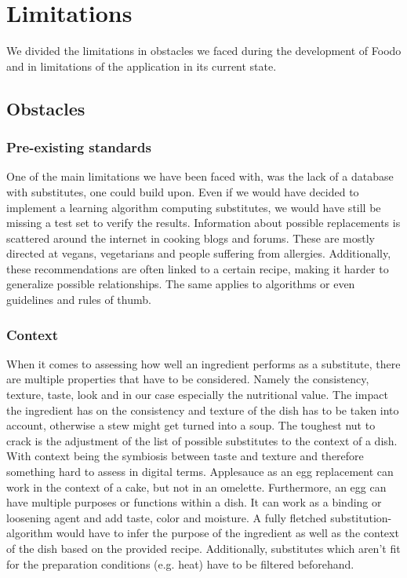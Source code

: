 \chapter{Limitations}

We divided the limitations in obstacles we faced during the development of Foodo and in limitations of the application in its current state.

\section{Obstacles}

\subsection*{Pre-existing standards}
One of the main limitations we have been faced with, was the lack of a database with substitutes, one could build upon. Even if we would have decided to implement a learning algorithm computing substitutes, we would have still be missing a test set to verify the results. Information about possible replacements is scattered around the internet in cooking blogs and forums. These are mostly directed at vegans, vegetarians and people suffering from allergies. Additionally, these recommendations are often linked to a certain recipe, making it harder to generalize possible relationships.
The same applies to algorithms or even guidelines and rules of thumb.

\subsection*{Context}
When it comes to assessing how well an ingredient performs as a substitute, there are multiple properties that have to be considered. Namely the consistency, texture, taste, look and in our case especially the nutritional value. The impact the ingredient has on the consistency and texture of the dish has to be taken into account, otherwise a stew might get turned into a soup. The toughest nut to crack is the adjustment of the list of possible substitutes to the context of a dish. With context being the symbiosis between taste and texture and therefore something hard to assess in digital terms. Applesauce as an egg replacement can work in the context of a cake, but not in an omelette. Furthermore, an egg can have multiple purposes or functions within a dish. It can work as a binding or loosening agent and add taste, color and moisture. A fully fletched substitution-algorithm would have to infer the purpose of the ingredient as well as the context of the dish based on the provided recipe. Additionally, substitutes which aren’t fit for the preparation conditions (e.g. heat) have to be filtered beforehand. 

